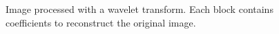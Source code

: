 \documentclass[12pt]{CPP}
\begin{document}
\begin{figure}[!htbp]
\begin{center}
\caption{Image processed with a wavelet transform. Each block contains coefficients to reconstruct the original image.}
\end{center}
\end{figure}
\end{document}
